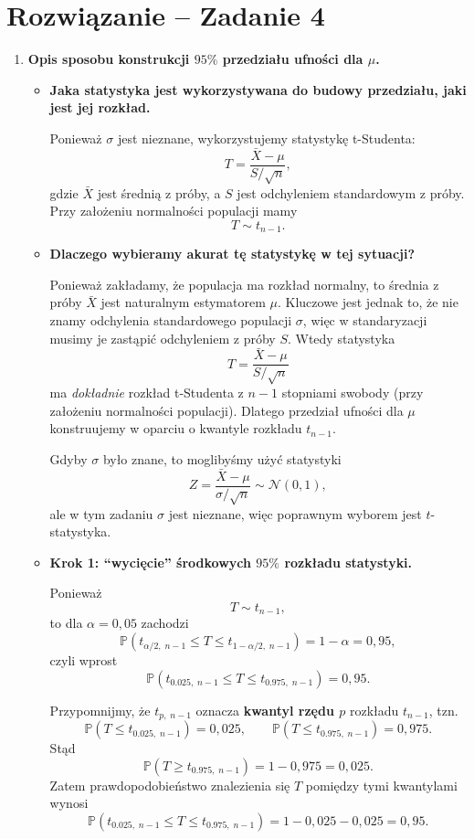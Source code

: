 \documentclass[polish, 10pt]{extarticle}
\begin{document}
\section*{Rozwiązanie -- Zadanie 4}

\begin{enumerate}
\item \textbf{Opis sposobu konstrukcji $95\%$ przedziału ufności dla $\mu$.}

\begin{itemize}
\item[a)] \textbf{Jaka statystyka jest wykorzystywana do budowy przedziału, jaki jest jej rozkład.}

Ponieważ $\sigma$ jest nieznane, wykorzystujemy statystykę t-Studenta:
\[
T=\frac{\bar{X}-\mu}{S/\sqrt{n}},
\]
gdzie $\bar{X}$ jest średnią z próby, a $S$ jest odchyleniem standardowym z próby.
Przy założeniu normalności populacji mamy
\[
T\sim t_{n-1}.
\]

\item[b)] \textbf{Dlaczego wybieramy akurat tę statystykę w tej sytuacji?}

Ponieważ zakładamy, że populacja ma rozkład normalny, to średnia z próby $\bar X$ jest naturalnym estymatorem $\mu$.
Kluczowe jest jednak to, że nie znamy odchylenia standardowego populacji $\sigma$, więc w standaryzacji musimy je zastąpić
odchyleniem z próby $S$. Wtedy statystyka
\[
T=\frac{\bar{X}-\mu}{S/\sqrt{n}}
\]
ma \emph{dokładnie} rozkład t-Studenta z $n-1$ stopniami swobody (przy założeniu normalności populacji). Dlatego
przedział ufności dla $\mu$ konstruujemy w oparciu o kwantyle rozkładu $t_{n-1}$.

Gdyby $\sigma$ było znane, to moglibyśmy użyć statystyki
\[
Z=\frac{\bar{X}-\mu}{\sigma/\sqrt{n}}\sim\mathcal{N}(0,1),
\]
ale w tym zadaniu $\sigma$ jest nieznane, więc poprawnym wyborem jest $t$-statystyka.

\item[c)] \textbf{Krok 1: ``wycięcie'' środkowych $95\%$ rozkładu statystyki.}

Ponieważ
\[
T\sim t_{n-1},
\]
to dla $\alpha=0{,}05$ zachodzi
\[
\mathbb{P}\!\left(t_{\alpha/2,\;n-1}\le T\le t_{1-\alpha/2,\;n-1}\right)=1-\alpha=0{,}95,
\]
czyli wprost
\[
\mathbb{P}\!\left(t_{0.025,\;n-1}\le T\le t_{0.975,\;n-1}\right)=0{,}95.
\]

Przypomnijmy, że $t_{p,\;n-1}$ oznacza \textbf{kwantyl rzędu $p$} rozkładu $t_{n-1}$, tzn.
\[
\mathbb{P}\!\left(T\le t_{0.025,\;n-1}\right)=0{,}025,
\qquad
\mathbb{P}\!\left(T\le t_{0.975,\;n-1}\right)=0{,}975.
\]
Stąd
\[
\mathbb{P}\!\left(T\ge t_{0.975,\;n-1}\right)=1-0{,}975=0{,}025.
\]
Zatem prawdopodobieństwo znalezienia się $T$ pomiędzy tymi kwantylami wynosi
\[
\mathbb{P}\!\left(t_{0.025,\;n-1}\le T\le t_{0.975,\;n-1}\right)
=1-0{,}025-0{,}025=0{,}95.
\]


\end{itemize}
\end{enumerate}
\end{document}
